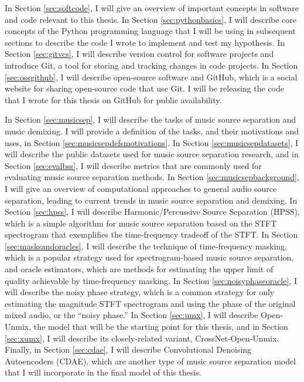 \documentclass[report.tex]{subfiles}
\begin{document}
In Section \ref{sec:softcode}, I will give an overview of important concepts in software and code relevant to this thesis. In Section \ref{sec:pythonbasics}, I will describe core concepts of the Python programming language that I will be using in subsequent sections to describe the code I wrote to implement and test my hypothesis. In Section \ref{sec:gitvcs}, I will describe version control for software projects and introduce Git, a tool for storing and tracking changes in code projects. In Section \ref{sec:ossgithub}, I will describe open-source software and GitHub, which is a social website for sharing open-source code that use Git. I will be releasing the code that I wrote for this thesis on GitHub for public availability.

In Section \ref{sec:musicsep}, I will describe the tasks of music source separation and music demixing. I will provide a definition of the tasks, and their motivations and uses, in Section \ref{sec:musicsepdefsmotivations}. In Section \ref{sec:musicsepdatasets}, I will describe the public datasets used for music source separation research, and in Section \ref{sec:evalbss}, I will describe metrics that are commonly used for evaluating music source separation methods. In Section \ref{sec:musicsepbackground}, I will give an overview of computational approaches to general audio source separation, leading to current trends in music source separation and demixing. In Section \ref{sec:hpss}, I will describe Harmonic/Percussive Source Separation (HPSS), which is a simple algorithm for music source separation based on the STFT spectrogram that exemplifies the time-frequency tradeoff of the STFT. In Section \ref{sec:masksandoracles}, I will describe the technique of time-frequency masking, which is a popular strategy used for spectrogram-based music source separation, and oracle estimators, which are methods for estimating the upper limit of quality achievable by time-frequency masking. In Section \ref{sec:noisyphaseoracle}, I will describe the noisy phase strategy, which is a common strategy for only estimating the magnitude STFT spectrogram and using the phase of the original mixed audio, or the ``noisy phase.'' In Section \ref{sec:umx}, I will describe Open-Unmix, the model that will be the starting point for this thesis, and in Section \ref{sec:xumx}, I will describe its closely-related variant, CrossNet-Open-Unmix. Finally, in Section \ref{sec:cdae}, I will describe Convolutional Denoising Autoencoders (CDAE), which are another type of music source separation model that I will incorporate in the final model of this thesis.
\end{document}
